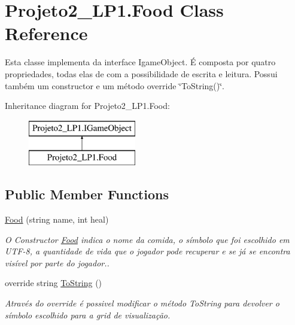 \hypertarget{class_projeto2___l_p1_1_1_food}{}\section{Projeto2\+\_\+\+L\+P1.\+Food Class Reference}
\label{class_projeto2___l_p1_1_1_food}


Esta classe implementa da interface Igame\+Object. É composta por quatro propriedades, todas elas de com a possibilidade de escrita e leitura. Possui também um constructor e um método override \char`\"{}\+To\+String()\char`\"{}.  


Inheritance diagram for Projeto2\+\_\+\+L\+P1.\+Food\+:\begin{figure}[H]
\begin{center}
\leavevmode
\includegraphics[height=2.000000cm]{class_projeto2___l_p1_1_1_food}
\end{center}
\end{figure}
\subsection*{Public Member Functions}
\begin{DoxyCompactItemize}
\item 
\mbox{\hyperlink{class_projeto2___l_p1_1_1_food_a61b898d655fa0265e899150e52d6b566}{Food}} (string name, int heal)
\begin{DoxyCompactList}\small\item\em O Constructor \mbox{\hyperlink{class_projeto2___l_p1_1_1_food}{Food}} indica o nome da comida, o símbolo que foi escolhido em U\+T\+F-\/8, a quantidade de vida que o jogador pode recuperar e se já se encontra visível por parte do jogador.. \end{DoxyCompactList}\item 
override string \mbox{\hyperlink{class_projeto2___l_p1_1_1_food_a023375f2f12e68f59e99448d020f0a61}{To\+String}} ()
\begin{DoxyCompactList}\small\item\em Através do override é possivel modificar o método To\+String para devolver o símbolo escolhido para a grid de visualização. \end{DoxyCompactList}\end{DoxyCompactItemize}

